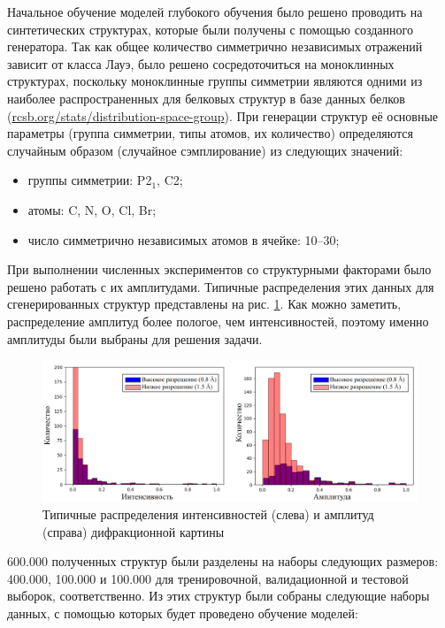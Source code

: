 Начальное обучение моделей глубокого обучения было решено проводить на синтетических структурах, которые были получены с помощью созданного генератора. Так как общее количество симметрично независимых отражений зависит от класса Лауэ, было решено сосредоточиться на моноклинных структурах, поскольку моноклинные группы симметрии являются одними из наиболее распространенных для белковых структур в базе данных белков (\url{rcsb.org/stats/distribution-space-group}). При генерации структур её основные параметры (группа симметрии, типы атомов, их количество) определяются случайным образом (случайное сэмплирование) из следующих значений: 

\begin{itemize}
\item группы симметрии: P2$_1$, C2;
\item атомы: C, N, O, Cl, Br;
\item число симметрично независимых атомов в ячейке: 10--30;
\end{itemize}

При выполнении численных экспериментов со структурными факторами было решено работать с их амплитудами. Типичные распределения этих данных для сгенерированных структур представлены на рис. \ref{F_dist}. Как можно заметить, распределение амплитуд более пологое, чем интенсивностей, поэтому именно амплитуды были выбраны для решения задачи. 


\begin{figure}[H]
			\centering
            \includegraphics[width=1\textwidth]{figures/F_both.png}
            \caption{Типичные распределения интенсивностей (слева) и амплитуд (справа) дифракционной картины}
            \label{F_dist}
\end{figure}


600.000 полученных структур были разделены на наборы следующих размеров: 400.000, 100.000 и 100.000 для тренировочной, валидационной и тестовой выборок, соответственно. Из этих структур были собраны следующие наборы данных, с помощью которых будет проведено обучение моделей:

